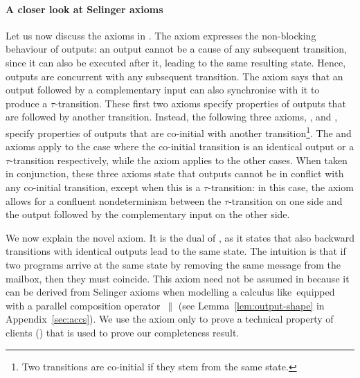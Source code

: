 \paragraph{A closer look at Selinger axioms}
Let us now discuss the axioms in .
The \outputcommutativity axiom expresses the non-blocking behaviour of
outputs: %
an output cannot be a cause of any subsequent transition, since it can
also be executed after it, leading to the same resulting state. Hence,
outputs are concurrent with any subsequent transition.  The
\outputfeedback axiom says that an output followed by a complementary
input can also synchronise with it to produce a $\tau$-transition.
These first
two axioms specify properties of outputs that are followed by another
transition. Instead, the following three axioms, \outputconfluence,
\outputdeterminacy and \outputtau, specify properties of outputs that
are co-initial with another transition\footnote{Two transitions are
  co-initial if they stem from the same state.}. The
\outputdeterminacy and \outputtau axioms apply to the case where the
co-initial transition is an identical output or a $\tau$-transition
respectively, while the \outputconfluence axiom applies to the other
cases.  When taken in conjunction, these three axioms state that outputs
cannot be in conflict %
with any co-initial transition, except when this is a
$\tau$-transition: in this case, the \outputtau axiom allows for a
confluent nondeterminism between the $\tau$-transition on one side and
the output followed by the complementary input on the other side.




We now explain the novel \outputdeterminacyinv axiom.  It is the dual of \outputdeterminacy, as it states that also backward transitions with identical outputs lead to the same state. The intuition is that if two programs arrive at the same state by removing the same message from the mailbox, then they must coincide. %
This axiom need not be assumed in \cite{DBLP:conf/concur/Selinger97} because it can be derived from Selinger axioms when modelling a calculus like~\ACCS equipped with a parallel composition operator~$\parallel$ (see Lemma~\ref{lem:output-shape} in Appendix~\ref{sec:accs}).  We use the \outputdeterminacyinv axiom only to prove a technical property of clients () that is used to prove our completeness result.
